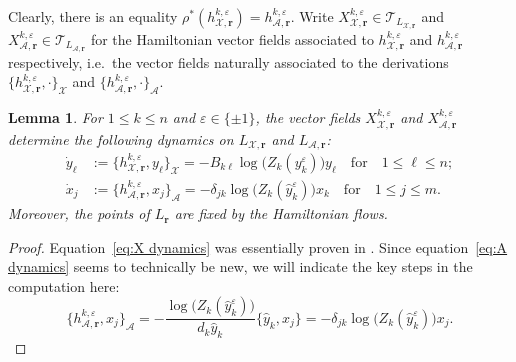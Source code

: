 \documentclass{amsart}
\newtheorem{lemma}[theorem]{Lemma}
\numberwithin{equation}{section}
\newcommand{\bfr}{{\boldsymbol{r}}}
\newcommand{\cA}{\mathcal{A}}
\newcommand{\cT}{\mathcal{T}}
\newcommand{\cX}{\mathcal{X}}
\begin{document}
Clearly, there is an equality $\rho^*(h_{\cX,\bfr}^{k,\varepsilon})=h_{\cA,\bfr}^{k,\varepsilon}$.
Write $X_{\cX,\bfr}^{k,\varepsilon}\in\cT_{L_{\cX,\bfr}}$ and $X_{\cA,\bfr}^{k,\varepsilon}\in\cT_{L_{\cA,\bfr}}$ for the Hamiltonian vector fields associated to $h_{\cX,\bfr}^{k,\varepsilon}$ and $h_{\cA,\bfr}^{k,\varepsilon}$ respectively, i.e.\ the vector fields naturally associated to the derivations $\{h_{\cX,\bfr}^{k,\varepsilon},\cdot\}_\cX$ and $\{h_{\cA,\bfr}^{k,\varepsilon},\cdot\}_\cA$.
\begin{lemma}
  \label{le:hamiltonian dynamics}
  For $1\le k\le n$ and $\varepsilon\in\{\pm1\}$, the vector fields $X_{\cX,\bfr}^{k,\varepsilon}$ and $X_{\cA,\bfr}^{k,\varepsilon}$ determine the following dynamics on $L_{\cX,\bfr}$ and $L_{\cA,\bfr}$:
  \begin{align}
    \label{eq:X dynamics}
    \dot y_\ell&:=\{h_{\cX,\bfr}^{k,\varepsilon},y_\ell\}_\cX=-B_{k\ell}\log\big(Z_k(y_k^\varepsilon)\big)y_\ell\quad\text{for}\quad 1\le\ell\le n;\\
    \label{eq:A dynamics}
    \dot x_j&:=\{h_{\cA,\bfr}^{k,\varepsilon},x_j\}_\cA=-\delta_{jk}\log\big(Z_k(\hat y_k^\varepsilon)\big)x_k\quad\text{for}\quad 1\le j\le m.
  \end{align}
  Moreover, the points of $L_\bfr$ are fixed by the Hamiltonian flows.
\end{lemma}
\begin{proof}
  Equation~\eqref{eq:X dynamics} was essentially proven in \cite{MR3691969}.
  Since equation~\eqref{eq:A dynamics} seems to technically be new, we will indicate the key steps in the computation here:
  \[\{h_{\cA,\bfr}^{k,\varepsilon},x_j\}_\cA=-\frac{\log\big(Z_k(\hat y_k^\varepsilon)\big)}{d_k\hat y_k}\{\hat y_k,x_j\}=-\delta_{jk}\log\big(Z_k(\hat y_k^\varepsilon)\big)x_j.\]
\end{proof}
\end{document}
